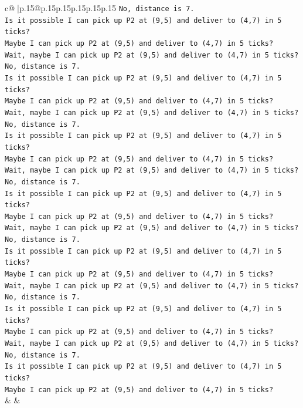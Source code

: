 \documentclass{article}
\begin{document}
{\begin{supertabular}{c@{$\;$}|p{.15\linewidth}@{}p{.15\linewidth}p{.15\linewidth}p{.15\linewidth}p{.15\linewidth}p{.15\linewidth}}
{{{\texttt{No, distance is 7.} \\
\texttt{Is it possible I can pick up P2 at (9,5) and deliver to (4,7) in 5 ticks?} \\
\texttt{Maybe I can pick up P2 at (9,5) and deliver to (4,7) in 5 ticks?} \\
\texttt{Wait, maybe I can pick up P2 at (9,5) and deliver to (4,7) in 5 ticks?} \\
\texttt{No, distance is 7.} \\
\texttt{Is it possible I can pick up P2 at (9,5) and deliver to (4,7) in 5 ticks?} \\
\texttt{Maybe I can pick up P2 at (9,5) and deliver to (4,7) in 5 ticks?} \\
\texttt{Wait, maybe I can pick up P2 at (9,5) and deliver to (4,7) in 5 ticks?} \\
\texttt{No, distance is 7.} \\
\texttt{Is it possible I can pick up P2 at (9,5) and deliver to (4,7) in 5 ticks?} \\
\texttt{Maybe I can pick up P2 at (9,5) and deliver to (4,7) in 5 ticks?} \\
\texttt{Wait, maybe I can pick up P2 at (9,5) and deliver to (4,7) in 5 ticks?} \\
\texttt{No, distance is 7.} \\
\texttt{Is it possible I can pick up P2 at (9,5) and deliver to (4,7) in 5 ticks?} \\
\texttt{Maybe I can pick up P2 at (9,5) and deliver to (4,7) in 5 ticks?} \\
\texttt{Wait, maybe I can pick up P2 at (9,5) and deliver to (4,7) in 5 ticks?} \\
\texttt{No, distance is 7.} \\
\texttt{Is it possible I can pick up P2 at (9,5) and deliver to (4,7) in 5 ticks?} \\
\texttt{Maybe I can pick up P2 at (9,5) and deliver to (4,7) in 5 ticks?} \\
\texttt{Wait, maybe I can pick up P2 at (9,5) and deliver to (4,7) in 5 ticks?} \\
\texttt{No, distance is 7.} \\
\texttt{Is it possible I can pick up P2 at (9,5) and deliver to (4,7) in 5 ticks?} \\
\texttt{Maybe I can pick up P2 at (9,5) and deliver to (4,7) in 5 ticks?} \\
\texttt{Wait, maybe I can pick up P2 at (9,5) and deliver to (4,7) in 5 ticks?} \\
\texttt{No, distance is 7.} \\
\texttt{Is it possible I can pick up P2 at (9,5) and deliver to (4,7) in 5 ticks?} \\
\texttt{Maybe I can pick up P2 at (9,5) and deliver to (4,7) in 5 ticks?} \\
            }
        }
    }
    & & \\ \\


\end{supertabular}}
\end{document}
